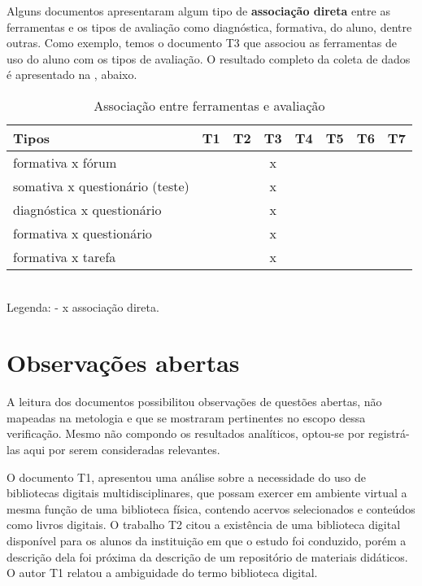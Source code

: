 Alguns documentos apresentaram algum tipo de \textbf{associação direta} entre as ferramentas e os tipos de avaliação como diagnóstica, formativa, do aluno, dentre outras. Como exemplo, temos o documento T3 que associou as ferramentas de uso do aluno com os tipos de avaliação. O resultado completo da coleta de dados é apresentado na , abaixo.

\begin{table}[ht!]
\footnotesize
\caption{Associação entre ferramentas e avaliação}
\label{tab:Q6}
\centering
\begin{tabular}{|l|c|c|c|c|c|c|c|}
\addlinespace \hline
    \bigstrut \textbf{Tipos}&{T1}&{T2}&{T3}&{T4}&{T5}&{T6}&{T7}\\
\hline
    \bigstrut[t]
    formativa x fórum           & 	&   & x &  &  &  &  \\ \hline
    somativa x questionário (teste)&  	&   & x &  &  &  &  \\ \hline	
    diagnóstica x questionário	& 	&   & x &  &  &  &  \\ \hline
    formativa x questionário	& 	&   & x &  &  &  &  \\ \hline
    \bigstrut[b]    
    formativa x tarefa          & 	&   & x &  &  &  &  \\
\hline
\end{tabular}
\\Legenda: - x associação direta.
\end{table}

\section{Observações abertas}%
A leitura dos documentos possibilitou observações de questões abertas, não mapeadas na metologia e que se mostraram pertinentes no escopo dessa verificação. Mesmo não compondo os resultados analíticos, optou-se por registrá-las aqui por serem consideradas relevantes.

O documento T1, apresentou uma análise sobre a necessidade do uso de bibliotecas digitais multidisciplinares, que possam exercer em ambiente virtual a mesma função de uma biblioteca física, contendo acervos selecionados e conteúdos como livros digitais. O trabalho T2 citou a existência de uma biblioteca digital disponível para os alunos da instituição em que o estudo foi conduzido, porém a descrição dela foi próxima da descrição de um repositório de materiais didáticos. O autor T1 relatou a ambiguidade do termo biblioteca digital. 

